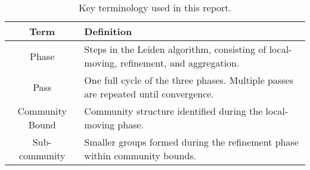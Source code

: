 \begin{table}[hbtp]
  \centering
  \caption{Key terminology used in this report.}
  \label{tab:terminology}
  \begin{tabular}{|c||p{40ex}|}
    \toprule
    \textbf{Term} &
    \textbf{Definition} \\
    \midrule
    Phase & Steps in the Leiden algorithm, consisting of local-moving, refinement, and aggregation. \\ \hline
    Pass & One full cycle of the three phases. Multiple passes are repeated until convergence. \\ \hline
    Community Bound & Community structure identified during the local-moving phase. \\ \hline
    Sub-community & Smaller groups formed during the refinement phase within community bounds. \\ \hline
  \bottomrule
  \end{tabular}
\end{table}
